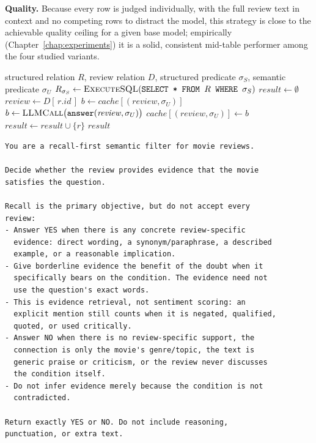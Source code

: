 \textbf{Quality.} Because every row is judged individually, with the
full review text in context and no competing rows to distract the model,
this strategy is close to the achievable quality ceiling for a given
base model; empirically (Chapter~\ref{chap:experiments}) it is a solid,
consistent mid-table performer among the four studied variants.

\begin{algorithm}[h]
\caption{SUQL baseline: row-wise predicate pushdown}
\label{alg:suql-baseline}
\begin{algorithmic}[1]
\Require structured relation $R$, review relation $D$, structured
predicate $\sigma_S$, semantic predicate $\sigma_U$
\State $R_{\sigma_S} \gets \textsc{ExecuteSQL}(\texttt{SELECT * FROM } R \texttt{ WHERE } \sigma_S)$
\State $\mathit{result} \gets \emptyset$
  \State $\mathit{review} \gets D[\,r.\mathit{id}\,]$ 
    \State $b \gets \mathit{cache}[(\mathit{review}, \sigma_U)]$
  \Else
    \State $b \gets \textsc{LLMCall}\bigl(\texttt{answer}(\mathit{review}, \sigma_U)\bigr)$ 
    \State $\mathit{cache}[(\mathit{review}, \sigma_U)] \gets b$
  \EndIf
    \State $\mathit{result} \gets \mathit{result} \cup \{r\}$
  \EndIf
\EndFor
\State \Return $\mathit{result}$
\end{algorithmic}
\end{algorithm}

\begin{lstlisting}[style=prompt, caption={\answerfn{} system prompt, verbatim from \texttt{project SUQL/baseline/suql\_engine.py} (SUQL baseline).}, label={lst:suql-prompt}]
You are a recall-first semantic filter for movie reviews.

Decide whether the review provides evidence that the movie
satisfies the question.

Recall is the primary objective, but do not accept every
review:
- Answer YES when there is any concrete review-specific
  evidence: direct wording, a synonym/paraphrase, a described
  example, or a reasonable implication.
- Give borderline evidence the benefit of the doubt when it
  specifically bears on the condition. The evidence need not
  use the question's exact words.
- This is evidence retrieval, not sentiment scoring: an
  explicit mention still counts when it is negated, qualified,
  quoted, or used critically.
- Answer NO when there is no review-specific support, the
  connection is only the movie's genre/topic, the text is
  generic praise or criticism, or the review never discusses
  the condition itself.
- Do not infer evidence merely because the condition is not
  contradicted.

Return exactly YES or NO. Do not include reasoning,
punctuation, or extra text.
\end{lstlisting}

